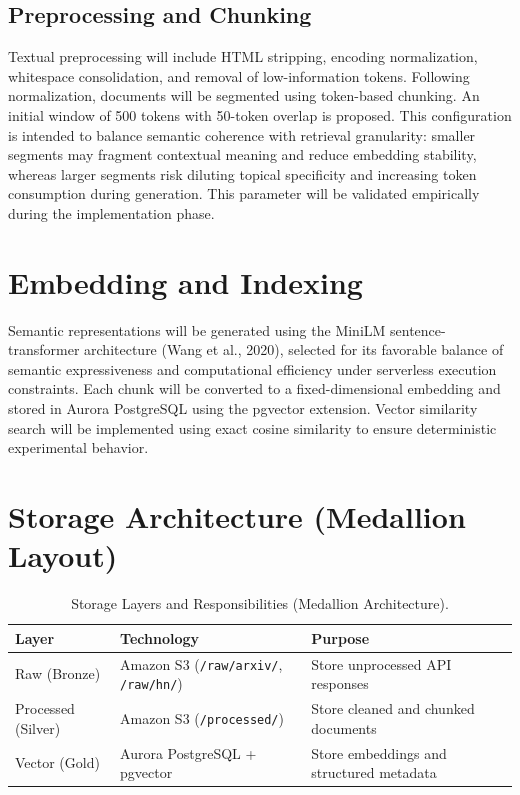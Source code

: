 \documentclass[12pt,a4paper]{report}
\begin{document}
\subsection{Preprocessing and Chunking}

Textual preprocessing will include HTML stripping, encoding normalization, whitespace consolidation, and removal of low-information tokens. Following normalization, documents will be segmented using token-based chunking. An initial window of 500 tokens with 50-token overlap is proposed. This configuration is intended to balance semantic coherence with retrieval granularity: smaller segments may fragment contextual meaning and reduce embedding stability, whereas larger segments risk diluting topical specificity and increasing token consumption during generation. This parameter will be validated empirically during the implementation phase.

\section{Embedding and Indexing}
\label{sec:embedding}

Semantic representations will be generated using the MiniLM sentence-transformer architecture (Wang et al., 2020), selected for its favorable balance of semantic expressiveness and computational efficiency under serverless execution constraints. Each chunk will be converted to a fixed-dimensional embedding and stored in Aurora PostgreSQL using the pgvector extension. Vector similarity search will be implemented using exact cosine similarity to ensure deterministic experimental behavior.

\section{Storage Architecture (Medallion Layout)}
\label{sec:storage}

\begin{table}[H]
\caption{Storage Layers and Responsibilities (Medallion Architecture).}
\label{tab:storage_layers}
\centering
\begin{tabular}{p{2.8cm}p{5.8cm}p{4.0cm}}
\toprule
\textbf{Layer} & \textbf{Technology} & \textbf{Purpose} \\
\midrule
Raw (Bronze) & Amazon S3 (\texttt{/raw/arxiv/}, \texttt{/raw/hn/}) & Store unprocessed API responses \\
Processed (Silver) & Amazon S3 (\texttt{/processed/}) & Store cleaned and chunked documents \\
Vector (Gold) & Aurora PostgreSQL + pgvector & Store embeddings and structured metadata \\
\bottomrule
\end{tabular}
\end{table}
\end{document}
